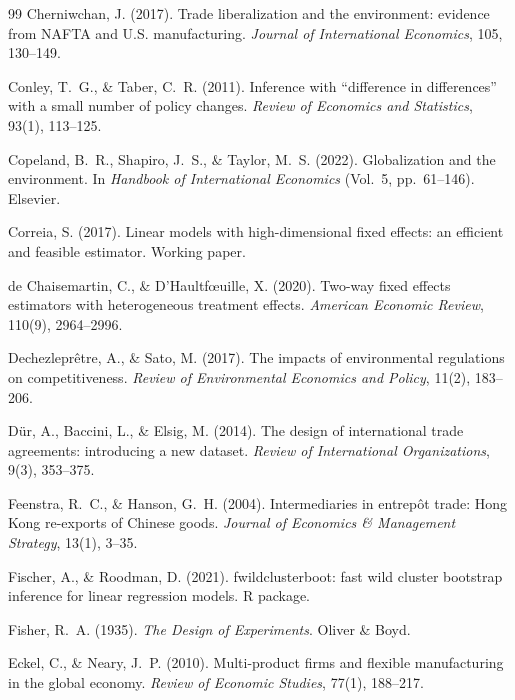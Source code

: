 \documentclass[12pt]{article}
\begin{document}
\begin{thebibliography}{99}
Cherniwchan, J. (2017).
Trade liberalization and the environment: evidence from NAFTA and U.S. manufacturing.
\emph{Journal of International Economics}, 105, 130--149.

Conley, T.~G., \& Taber, C.~R. (2011).
Inference with ``difference in differences'' with a small number of policy changes.
\emph{Review of Economics and Statistics}, 93(1), 113--125.

Copeland, B.~R., Shapiro, J.~S., \& Taylor, M.~S. (2022).
Globalization and the environment.
In \emph{Handbook of International Economics} (Vol.~5, pp.~61--146). Elsevier.

Correia, S. (2017).
Linear models with high-dimensional fixed effects: an efficient and feasible estimator.
Working paper.

de Chaisemartin, C., \& D'Haultf\oe uille, X. (2020).
Two-way fixed effects estimators with heterogeneous treatment effects.
\emph{American Economic Review}, 110(9), 2964--2996.

Dechezlepr\^etre, A., \& Sato, M. (2017).
The impacts of environmental regulations on competitiveness.
\emph{Review of Environmental Economics and Policy}, 11(2), 183--206.

D\"ur, A., Baccini, L., \& Elsig, M. (2014).
The design of international trade agreements: introducing a new dataset.
\emph{Review of International Organizations}, 9(3), 353--375.

Feenstra, R.~C., \& Hanson, G.~H. (2004).
Intermediaries in entrep\^ot trade: Hong Kong re-exports of Chinese goods.
\emph{Journal of Economics \& Management Strategy}, 13(1), 3--35.

Fischer, A., \& Roodman, D. (2021).
fwildclusterboot: fast wild cluster bootstrap inference for linear regression models.
R package.

Fisher, R.~A. (1935).
\emph{The Design of Experiments}. Oliver \& Boyd.

Eckel, C., \& Neary, J.~P. (2010).
Multi-product firms and flexible manufacturing in the global economy.
\emph{Review of Economic Studies}, 77(1), 188--217.


\end{thebibliography}
\end{document}
